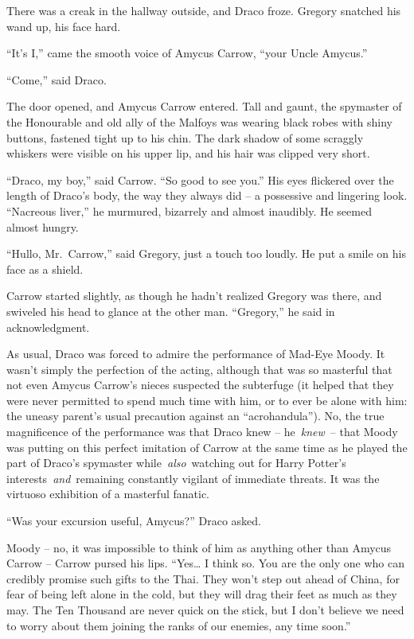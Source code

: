 There was a creak in the hallway outside, and Draco froze. Gregory
snatched his wand up, his face hard.

``It's I,'' came the smooth voice of Amycus Carrow, ``your Uncle
Amycus.''

``Come,'' said Draco.

The door opened, and Amycus Carrow entered. Tall and gaunt, the
spymaster of the Honourable and old ally of the Malfoys was wearing
black robes with shiny buttons, fastened tight up to his chin. The dark
shadow of some scraggly whiskers were visible on his upper lip, and his
hair was clipped very short.

``Draco, my boy,'' said Carrow. ``So good to see you.'' His eyes
flickered over the length of Draco's body, the way they always did -- a
possessive and lingering look. ``Nacreous liver,'' he murmured,
bizarrely and almost inaudibly. He seemed almost hungry.

``Hullo, Mr.~Carrow,'' said Gregory, just a touch too loudly. He put a
smile on his face as a shield.

Carrow started slightly, as though he hadn't realized Gregory was there,
and swiveled his head to glance at the other man. ``Gregory,'' he said
in acknowledgment.

As usual, Draco was forced to admire the performance of Mad-Eye Moody.
It wasn't simply the perfection of the acting, although that was so
masterful that not even Amycus Carrow's nieces suspected the subterfuge
(it helped that they were never permitted to spend much time with him,
or to ever be alone with him: the uneasy parent's usual precaution
against an ``acrohandula''). No, the true magnificence of the
performance was that Draco knew -- he~\emph{knew}~-- that Moody was
putting on this perfect imitation of Carrow at the same time as he
played the part of Draco's spymaster while~\emph{also}~watching out for
Harry Potter's interests~\emph{and}~remaining constantly vigilant of
immediate threats. It was the virtuoso exhibition of a masterful
fanatic.

``Was your excursion useful, Amycus?'' Draco asked.

Moody -- no, it was impossible to think of him as anything other than
Amycus Carrow -- Carrow pursed his lips. ``Yes\ldots{} I think so. You
are the only one who can credibly promise such gifts to the Thai. They
won't step out ahead of China, for fear of being left alone in the cold,
but they will drag their feet as much as they may. The Ten Thousand are
never quick on the stick, but I don't believe we need to worry about
them joining the ranks of our enemies, any time soon.''

